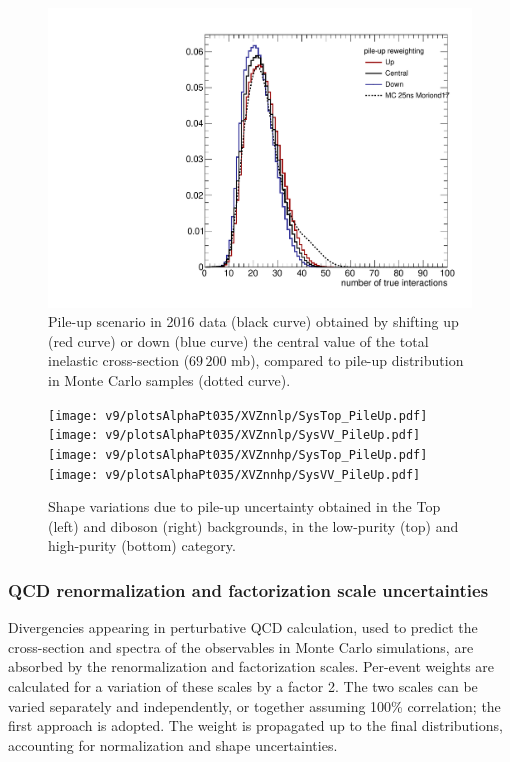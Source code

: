 \begin{figure}[!htb]
  \begin{center}
    \includegraphics[width=.495\textwidth]{figures/PU_Moriond17.pdf}
  \end{center}
  \caption{Pile-up scenario in 2016 data (black curve) obtained by shifting up (red curve) or down (blue curve) the central value of the total inelastic cross-section ($69\,200$ mb), compared to pile-up distribution in Monte Carlo samples (dotted curve).}
  \label{fig:PU_updown}
\end{figure}

 \begin{figure}[!htb]
   \begin{center}
     \texttt{[image: v9/plotsAlphaPt035/XVZnnlp/SysTop\_PileUp.pdf]}
     \texttt{[image: v9/plotsAlphaPt035/XVZnnlp/SysVV\_PileUp.pdf]}
     \\
     \texttt{[image: v9/plotsAlphaPt035/XVZnnhp/SysTop\_PileUp.pdf]}
     \texttt{[image: v9/plotsAlphaPt035/XVZnnhp/SysVV\_PileUp.pdf]}

   \end{center}
   \caption{Shape variations due to pile-up uncertainty obtained in the Top (left) and diboson (right) backgrounds, in the low-purity (top) and high-purity (bottom) category.}
   \label{fig:syspileup}
 \end{figure}


\subsubsection{QCD renormalization and factorization scale uncertainties}

Divergencies appearing in perturbative QCD calculation, used to predict the cross-section and spectra of the observables in Monte Carlo simulations, are absorbed by the renormalization and factorization scales. Per-event weights are calculated for a variation of these scales by a factor 2. The two scales can be varied separately and independently, or together assuming 100\% correlation; the first approach is adopted. The weight is propagated up to the final distributions, accounting for normalization and shape uncertainties.

